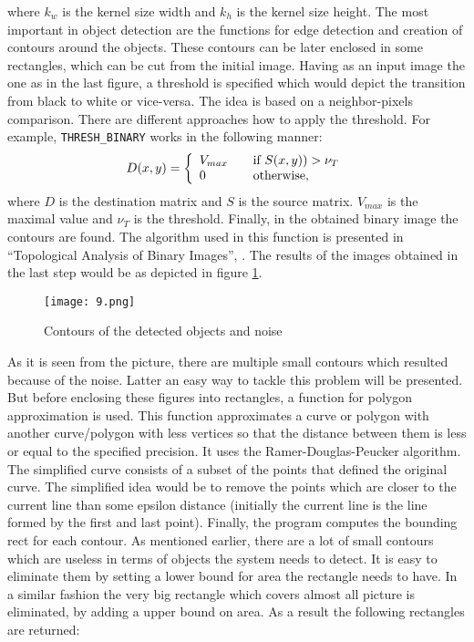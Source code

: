 where \( k_{w} \) is the kernel size width and \( k_{h} \) is the kernel size height.
      The most important in object detection are the functions for edge detection and creation of contours around the objects. These contours can be later enclosed in some rectangles, which can be cut from the initial image. Having as an input image the one as in the last figure, a threshold is specified which would depict the transition from black to white or vice-versa. The idea is based on a neighbor-pixels comparison. There are different approaches how to apply the threshold. For example, \verb|THRESH_BINARY| works in the following manner:
      \begin{equation}
       D(x,y) = \left\{ 
        \begin
          {array}{l l}
            V_{max} & \quad \text{if \(S(x,y)) > \nu_{T}\)}\\
            0 & \quad \text{otherwise},
        \end{array} 
        \right.
        \end{equation}
        where \( D \) is the destination matrix and \( S \) is the source matrix. \( V_{max}\) is the maximal value and \( \nu_{T}\) is the threshold. 
      Finally, in the obtained binary image the contours are found. The algorithm used in this function is presented in ``Topological Analysis of Binary Images'', \cite{suzuki}. The results of the images obtained in the last step would be as depicted in figure \ref{contours}.

      \begin{figure}[ht!]
        \centering
        \texttt{[image: 9.png]} 
        \caption{Contours of the detected objects and noise}
        \label{contours}
      \end{figure}

      As it is seen from the picture, there are multiple small contours which resulted because of the noise. Latter an easy way to tackle this problem will be presented. But before enclosing these figures into rectangles, a function for polygon approximation is used. This function approximates a curve or polygon with another curve/polygon with less vertices so that the distance between them is less or equal to the specified precision. It uses the Ramer-Douglas-Peucker algorithm. The simplified curve consists of a subset of the points that defined the original curve. The simplified idea would be to remove the points which are closer to the current line than some epsilon distance (initially the current line is the line formed by the first and last point). Finally, the program computes the bounding rect for each contour. As mentioned earlier, there are a lot of small contours which are useless in terms of objects the system needs to detect. It is easy to eliminate them by setting a lower bound for area the rectangle needs to have. In a similar fashion the very big rectangle which covers almost all picture is eliminated, by adding a upper bound on area. As a result the following rectangles are returned:

